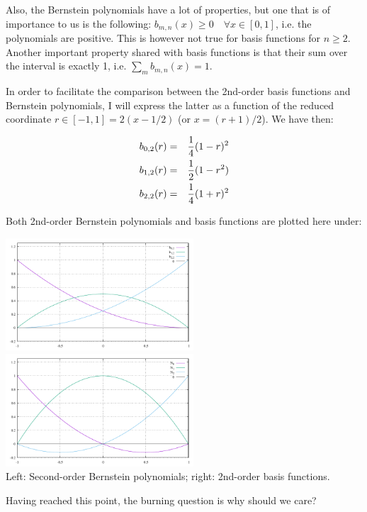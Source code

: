 Also, the Bernstein polynomials have a lot of properties, but one that is of importance to us
is the following: $b_{m,n}(x) \geq 0 \quad  \forall x\in [0,1]$, i.e. the polynomials 
are positive. This is however not true for basis functions for $n\geq 2$.
Another important property shared with basis functions is that their sum over the interval is 
exactly 1, i.e. $\sum_m b_{m,n}(x)=1$.

In order to facilitate the comparison between the 2nd-order basis functions and Bernstein 
polynomials, I will express the latter as a function of the reduced coordinate
$r\in[-1,1]=2(x-1/2)$ (or $x=(r+1)/2$). We have then:

\begin{eqnarray}
b_{0,2}(r) &=& \frac{1}{4}(1-r)^2 \nonumber\\
b_{1,2}(r) &=& \frac{1}{2}(1-r^2) \nonumber\\
b_{2,2}(r) &=& \frac{1}{4}(1+r)^2
\end{eqnarray}

Both 2nd-order Bernstein polynomials and basis functions are plotted here under:
\begin{center}
\includegraphics[width=7cm]{images/bernstein/b2_.pdf}
\includegraphics[width=7cm]{images/bernstein/N2_.pdf}\\
{\captionfont Left: Second-order Bernstein polynomials; right: 2nd-order basis functions.}
\end{center}

Having reached this point, the burning question is why should we care?

